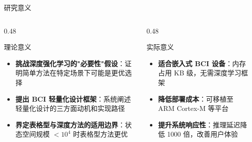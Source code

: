 \begin{frame}{研究意义}
    \begin{columns}[T]
        \begin{column}{0.48\textwidth}
            \begin{block}{\normalsize \textcolor{primaryblue}{理论意义}}
                \begin{itemize}
                    \item \textbf{挑战深度强化学习的"必要性"假设}：证明简单方法在特定场景下可能是更优选择
                    \item \textbf{提出 BCI 轻量化设计框架}：系统阐述轻量化设计的三方面动机和实现路径
                    \item \textbf{界定表格型与深度方法的适用边界}：状态空间规模 $< 10^4$ 时表格型方法更优
                \end{itemize}
            \end{block}
        \end{column}

        \begin{column}{0.48\textwidth}
            \begin{block}{\normalsize \textcolor{accentgreen}{实际意义}}
                \begin{itemize}
                    \item \textbf{适合嵌入式 BCI 设备}：内存占用 KB 级，无需深度学习框架
                    \item \textbf{降低部署成本}：可移植至 ARM Cortex-M 等平台
                    \item \textbf{提升系统响应性}：推理延迟降低 1000 倍，改善用户体验
                \end{itemize}
            \end{block}
        \end{column}
    \end{columns}
\end{frame}
